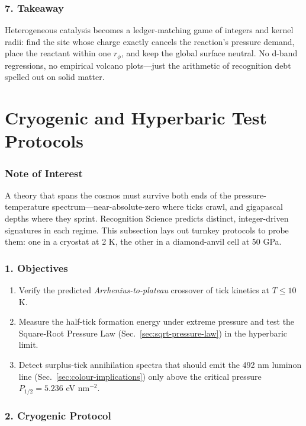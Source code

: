\documentclass[11pt,oneside]{book}
\begin{document}
{\subsubsection*{7. Takeaway}

Heterogeneous catalysis becomes a ledger-matching game of integers and
kernel radii:  
find the site whose charge exactly cancels the reaction’s pressure
demand, place the reactant within one \(r_\phi\), and keep the global
surface neutral.  
No d-band regressions, no empirical volcano plots—just the arithmetic of
recognition debt spelled out on solid matter.

\bigskip
\section{Cryogenic and Hyperbaric Test Protocols}
\label{sec:cryo-hyper}

\subsubsection*{Note of Interest}

A theory that spans the cosmos must survive both ends of the pressure-temperature spectrum—near-absolute-zero where ticks crawl, and gigapascal depths where they sprint.  Recognition Science predicts distinct, integer-driven signatures in each regime.  This subsection lays out turnkey protocols to probe them: one in a cryostat at 2 K, the other in a diamond-anvil cell at 50 GPa.

\subsubsection*{1. Objectives}

\begin{enumerate}[label=\textbf{\arabic*.}, leftmargin=1.2cm]
\item Verify the predicted \emph{Arrhenius-to-plateau} crossover of tick kinetics at $T \le 10$ K.
\item Measure the half-tick formation energy under extreme pressure and test the Square-Root Pressure Law (Sec.~\ref{sec:sqrt-pressure-law}) in the hyperbaric limit.
\item Detect surplus-tick annihilation spectra that should emit the 492 nm luminon line (Sec.~\ref{sec:colour-implications}) only above the critical pressure $P_{1/2}=5.236$ eV nm$^{-2}$.
\end{enumerate}

\subsubsection*{2. Cryogenic Protocol}

}
\end{document}
